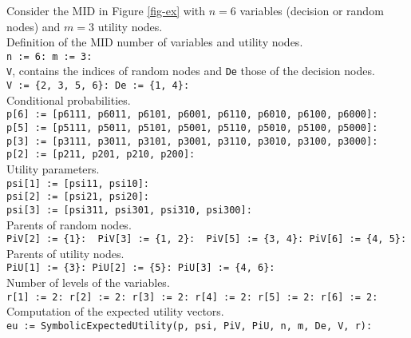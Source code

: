 \noindent Consider the MID in Figure \ref{fig-ex} with $n=6$ variables (decision or random nodes) and $m=3$ utility nodes.\\
Definition of the MID number of variables and  utility nodes.\\
\verb|n := 6: m := 3:|\\
\verb|V|, contains the indices of random nodes and \verb|De|  those of the decision nodes.\\
\verb|V := {2, 3, 5, 6}: De := {1, 4}:|\\
Conditional probabilities.\\
\verb|p[6] := [p6111, p6011, p6101, p6001, p6110, p6010, p6100, p6000]:|\\
\verb|p[5] := [p5111, p5011, p5101, p5001, p5110, p5010, p5100, p5000]:|\\
\verb|p[3] := [p3111, p3011, p3101, p3001, p3110, p3010, p3100, p3000]:|\\
\verb|p[2] := [p211, p201, p210, p200]:|\\
Utility parameters.\\
\verb|psi[1] := [psi11, psi10]:|\\
\verb|psi[2] := [psi21, psi20]:|\\
\verb|psi[3] := [psi311, psi301, psi310, psi300]:|\\
Parents of random nodes.\\
\verb|PiV[2] := {1}:  PiV[3] := {1, 2}:  PiV[5] := {3, 4}: PiV[6] := {4, 5}:|\\
Parents of utility nodes.\\
\verb|PiU[1] := {3}: PiU[2] := {5}: PiU[3] := {4, 6}:|\\
Number of levels of the variables.\\
\verb|r[1] := 2: r[2] := 2: r[3] := 2: r[4] := 2: r[5] := 2: r[6] := 2:| \\
Computation of the expected utility vectors.\\
\verb|eu := SymbolicExpectedUtility(p, psi, PiV, PiU, n, m, De, V, r):|

